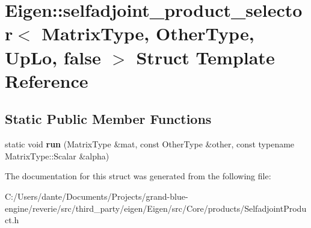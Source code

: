 \hypertarget{struct_eigen_1_1selfadjoint__product__selector_3_01_matrix_type_00_01_other_type_00_01_up_lo_00_01false_01_4}{}\section{Eigen\+::selfadjoint\+\_\+product\+\_\+selector$<$ Matrix\+Type, Other\+Type, Up\+Lo, false $>$ Struct Template Reference}
\label{struct_eigen_1_1selfadjoint__product__selector_3_01_matrix_type_00_01_other_type_00_01_up_lo_00_01false_01_4}
\subsection*{Static Public Member Functions}
\begin{DoxyCompactItemize}
\item 
\mbox{\label{struct_eigen_1_1selfadjoint__product__selector_3_01_matrix_type_00_01_other_type_00_01_up_lo_00_01false_01_4_af4105cc4314d61eded8193ba3ec2069d}} 
static void {\bfseries run} (Matrix\+Type \&mat, const Other\+Type \&other, const typename Matrix\+Type\+::\+Scalar \&alpha)
\end{DoxyCompactItemize}


The documentation for this struct was generated from the following file\+:\begin{DoxyCompactItemize}
\item 
C\+:/\+Users/dante/\+Documents/\+Projects/grand-\/blue-\/engine/reverie/src/third\+\_\+party/eigen/\+Eigen/src/\+Core/products/Selfadjoint\+Product.\+h\end{DoxyCompactItemize}
